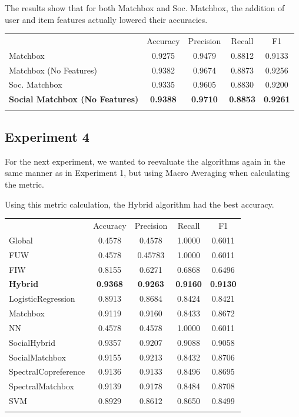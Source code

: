 The results show that for both Matchbox and Soc. Matchbox, the addition of user and item features actually lowered their accuracies. 

\begin{table}
\begin{tabular}{ l  c  c  c  c }
\hline\noalign{\smallskip}
 & Accuracy & Precision & Recall & F1 \\
  \noalign{\smallskip}\hline\noalign{\smallskip}
Matchbox & 0.9275 & 0.9479 & 0.8812 & 0.9133 \\
Matchbox (No Features) & 0.9382  & 0.9674  & 0.8873 & 0.9256 \\
Soc. Matchbox  & 0.9335 & 0.9605  & 0.8830  & 0.9200  \\
{\bf Social Matchbox (No Features)} & {\bf 0.9388} & {\bf 0.9710} & {\bf 0.8853} &  {\bf 0.9261} \\
\noalign{\smallskip}\hline
 \end{tabular} 
\end{table}

\subsection{Experiment 4}
\label{sec:2}

For the next experiment, we wanted to reevaluate the algorithms again in the same manner as in Experiment 1, but using Macro Averaging when calculating the metric.

Using this metric calculation, the Hybrid algorithm had the best accuracy.

\begin{table}
\begin{tabular}{ l  c  c  c  c }
\hline\noalign{\smallskip}
 & Accuracy & Precision & Recall & F1 \\
  \noalign{\smallskip}\hline\noalign{\smallskip}
Global &  0.4578 & 0.4578 & 1.0000 & 0.6011 \\
FUW &  0.4578  & 0.45783  & 1.0000 & 0.6011 \\
FIW & 0.8155 & 0.6271 & 0.6868 & 0.6496 \\
{\bf Hybrid} & {\bf 0.9368} & {\bf 0.9263} & {\bf 0.9160} & {\bf 0.9130} \\
LogisticRegression & 0.8913 & 0.8684 & 0.8424 & 0.8421 \\
Matchbox & 0.9119 &  0.9160 & 0.8433 & 0.8672 \\
NN & 0.4578 & 0.4578 & 1.0000 & 0.6011 \\
SocialHybrid & 0.9357  & 0.9207 & 0.9088 & 0.9058 \\
SocialMatchbox & 0.9155 & 0.9213 & 0.8432 & 0.8706 \\
SpectralCopreference & 0.9136 & 0.9133 & 0.8496 & 0.8695 \\
SpectralMatchbox & 0.9139 & 0.9178 & 0.8484 & 0.8708 \\
SVM & 0.8929 & 0.8612 & 0.8650 & 0.8499 \\
\noalign{\smallskip}\hline
\end{tabular} 
\end{table}
 

